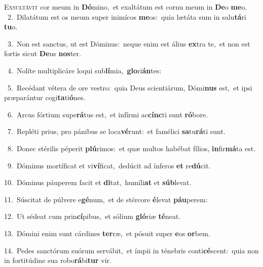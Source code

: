 \lettrine{\initial\textcolor{\initialcolor}{E}}{xsultávit} cor meum in \textbf{Dó}\-mino,~\star et exaltátum est cornu meum in \textbf{De}\-o \textbf{me}\-o.\\
{\numbfont\textcolor{\numbcolor}{~2.}}~Dilatátum est os meum super inimícos \textbf{me}\-os:~\star quia lætáta sum in salu\-\textbf{tá}\-ri \textbf{tu}\-o.\par
{\numbfont\textcolor{\numbcolor}{~3.}}~Non est sanctus, ut est Dóminus:~\dagger neque enim est álius \textbf{ex}\-tra te,~\star et non est fortis sicut \textbf{De}\-us \textbf{nos}\-ter.\par
{\numbfont\textcolor{\numbcolor}{~4.}}~Nolíte multiplicáre loqui sub\-\textbf{lí}\-mia,~\star \textbf{glo}\-ri\-\textbf{án}\-tes:\par
{\numbfont\textcolor{\numbcolor}{~5.}}~Recédant vétera de ore vestro:~\dagger quia Deus scientiárum, Dómi\textbf{nus} est,~\star et ipsi præparántur cogi\-\textbf{ta}\-ti\-\textbf{ó}\-nes.\par
{\numbfont\textcolor{\numbcolor}{~6.}}~Arcus fórtium supe\-\textbf{rá}\-tus est,~\star et infírmi ac\-\textbf{cínc}\-ti sunt \textbf{ró}\-bore.\par
{\numbfont\textcolor{\numbcolor}{~7.}}~Repléti prius, pro pánibus se loca\-\textbf{vé}\-runt:~\star et famélici \textbf{sa}\-tu\-\textbf{rá}\-ti sunt.\par
{\numbfont\textcolor{\numbcolor}{~8.}}~Donec stérilis péperit \textbf{plú}\-rimos:~\star et quæ multos habébat fílios, \textbf{in}\-fir\-\textbf{má}\-ta est.\par
{\numbfont\textcolor{\numbcolor}{~9.}}~Dóminus mortíficat et vi\-\textbf{ví}\-ficat,~\star dedúcit ad ínferos \textbf{et} re\-\textbf{dú}\-cit.\par
{\numbfont\textcolor{\numbcolor}{10.}}~Dóminus páuperem facit et \textbf{di}\-tat,~\star humíli\textbf{at} et \textbf{súb}\-levat.\par
{\numbfont\textcolor{\numbcolor}{11.}}~Súscitat de púlvere e\-\textbf{gé}\-num,~\star et de stércore \textbf{é}\-levat \textbf{páu}\-perem:\par
{\numbfont\textcolor{\numbcolor}{12.}}~Ut sédeat cum prin\-\textbf{cí}\-pibus,~\star et sólium \textbf{gló}\-riæ \textbf{té}\-neat.\par
{\numbfont\textcolor{\numbcolor}{13.}}~Dómini enim sunt cárdines \textbf{ter}\-ræ,~\star et pósuit super \textbf{e}\-os \textbf{or}\-bem.\par
{\numbfont\textcolor{\numbcolor}{14.}}~Pedes sanctórum suórum servábit,~\dagger et ímpii in ténebris conti\-\textbf{cé}\-scent:~\star quia non in fortitúdine sua robo\-\textbf{rá}\-bi\textbf{tur} vir.\par
